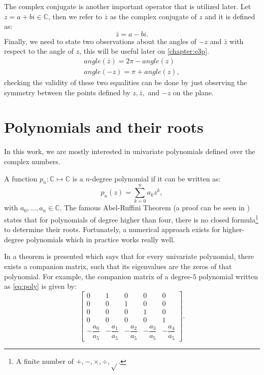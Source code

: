 The complex conjugate is another important operator that is utilized later. Let $z = a + bi \in \mathbb{C}$, then we refer to $\bar{z}$ as the complex conjugate of $z$ and it is defined as:
\begin{equation}
\bar{z} = a - bi.
\end{equation}
Finally, we need to state two observations about the angles of $-z$ and $\bar{z}$ with respect to the angle of $z$, this will be useful later on \autoref{chapter:e3p}.
\begin{align}
angle(\bar{z}) = 2\pi-angle(z)\\
angle(-z) = \pi + angle(z),
\end{align}
checking the validity of these two equalities can be done by just observing the symmetry between the points defined by $z, \bar{z},$ and $-z$ on the plane.


\section{Polynomials and their roots}

In this work, we are mostly interested in univariate polynomials defined over the complex numbers.

A function $p_n: \mathbb{C} \mapsto \mathbb{C}$ is a $n$-degree polynomial if it can be written as:
\begin{equation}\label{eq:poly}
p_n(z) = \sum_{k=0}^{n} a_k z^k,
\end{equation}
with $a_0, \dots, a_n \in \mathbb{C}$.
The famous Abel-Ruffini Theorem (a proof can be seen in ) states that for polynomials of degree higher than four, there is no closed formula\footnote{A finite number of $+, -, \times, \div, \sqrt{}$.} to determine their roots. Fortunately, a numerical approach exists for higher-degree polynomials which in practice works really well.

 In  a theorem is presented which says that for every univariate polynomial, there exists a companion matrix, such that its eigenvalues are the zeros of that polynomial.  For example, the companion matrix of a degree-$5$ polynomial written as \autoref{eq:poly} is given by:
 \begin{equation}
 \left[\begin{array}{ccccc}
 0 & 1 & 0 & 0 & 0\\
 0 & 0 & 1 & 0 & 0\\
 0 & 0 & 0 & 1 & 0\\
 0 & 0 & 0 & 0 & 1\\
 -\dfrac{a_0}{a_5} & -\dfrac{a_1}{a_5} & -\dfrac{a_2}{a_5} & -\dfrac{a_3}{a_5} & -\dfrac{a_4}{a_5}
 \end{array}\right].
 \end{equation}
 
